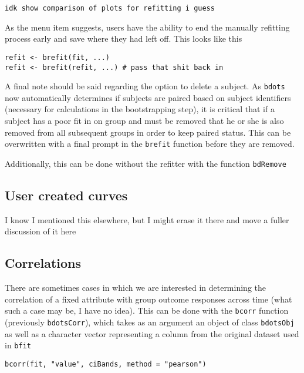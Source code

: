 \documentclass{article}
\begin{document}
\begin{center}
\texttt{idk show comparison of plots for refitting i guess}
\end{center}

As the menu item suggests, users have the ability to end the manually refitting process early and save where they had left off. This looks like this

\begin{center}
\texttt{refit <- brefit(fit, ...)} \\
\texttt{refit <- brefit(refit, ...) \# pass that shit back in}
\end{center}

A final note should be said regarding the option to delete a subject. As \texttt{bdots} now automatically determines if subjects are paired based on subject identifiers (necessary for  calculations in the bootstrapping step), it is critical that if a subject has a poor fit in on group and must be removed that he or she is also removed from all subsequent groups in order to keep paired status. This can be overwritten with a final prompt in the \texttt{brefit} function before they are removed.

Additionally, this can be done without the refitter with the function \texttt{bdRemove}


\subsection{User created curves}

I know I mentioned this elsewhere, but I might erase it there and move a fuller discussion of it here

\subsection{Correlations}

There are sometimes cases in which we are interested in determining the correlation of a fixed attribute with group outcome responses across time (what such a case may be, I have no idea). This can be done with the \texttt{bcorr} function (previously \texttt{bdotsCorr}), which takes as an argument an object of class \texttt{bdotsObj} as well as a character vector representing a column from the original dataset used in \texttt{bfit}

\begin{center}
\texttt{bcorr(fit, "value", ciBands, method = "pearson")} 
\end{center}
\end{document}
